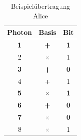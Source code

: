 \begin{table}[!htb]
    \parbox{.45\linewidth}{
        \centering
        \begin{tabular}{|c|c|c|}
        \hline
        Photon      & Basis             & Bit           \\ \hline
        \textbf{1}  & \textbf{+}        & \textbf{1}    \\ \hline
        2           & $\times$          & 1             \\ \hline 
        \textbf{3}  & \textbf{+}        & \textbf{0}    \\ \hline
        4           & +                 & 1             \\ \hline
        \textbf{5}  & \textbf{$\times$} & \textbf{1}    \\ \hline
        \textbf{6}  & \textbf{+}        & \textbf{0}    \\ \hline
        \textbf{7}  & \textbf{$\times$} & \textbf{0}    \\ \hline
        8           & $\times$          & 1             \\ \hline
        \end{tabular}
        \caption{Beispielübertragung Alice}    
    }

    
    \label{table:alice-bob-uebertragung}
\end{table}
    
